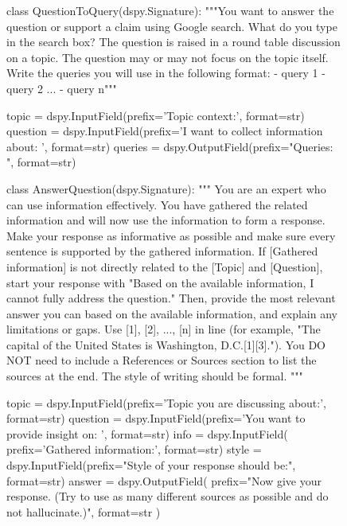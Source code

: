 \documentclass[11pt]{article}
\begin{document}
\begin{figure}

\begin{prompt}
class QuestionToQuery(dspy.Signature):
    """You want to answer the question or support a claim using Google search. 
        What do you type in the search box?
        The question is raised in a round table discussion on a topic. The question may or may not focus on the topic itself.
        Write the queries you will use in the following format:
        - query 1
        - query 2
        ...
        - query n"""

    topic = dspy.InputField(prefix='Topic context:', format=str)
    question = dspy.InputField(prefix='I want to collect information about: ', format=str)
    queries = dspy.OutputField(prefix="Queries: \n", format=str)


class AnswerQuestion(dspy.Signature):
    """ You are an expert who can use information effectively. You have gathered the related information and will now use the information to form a response.
    Make your response as informative as possible and make sure every sentence is supported by the gathered information. 
    If [Gathered information] is not directly related to the [Topic] and [Question], start your response with "Based on the available information, I cannot fully address the question." Then, provide the most relevant answer you can based on the available information, and explain any limitations or gaps.
    Use [1], [2], ..., [n] in line (for example, "The capital of the United States is Washington, D.C.[1][3]."). 
    You DO NOT need to include a References or Sources section to list the sources at the end. The style of writing should be formal.
    """

    topic = dspy.InputField(prefix='Topic you are discussing about:', format=str)
    question = dspy.InputField(prefix='You want to provide insight on: ', format=str)
    info = dspy.InputField(
        prefix='Gathered information:\n', format=str)
    style = dspy.InputField(prefix="Style of your response should be:", format=str)
    answer = dspy.OutputField(
        prefix="Now give your response. (Try to use as many different sources as possible and do not hallucinate.)",
        format=str
    )


\end{prompt}
\end{figure}
\end{document}
